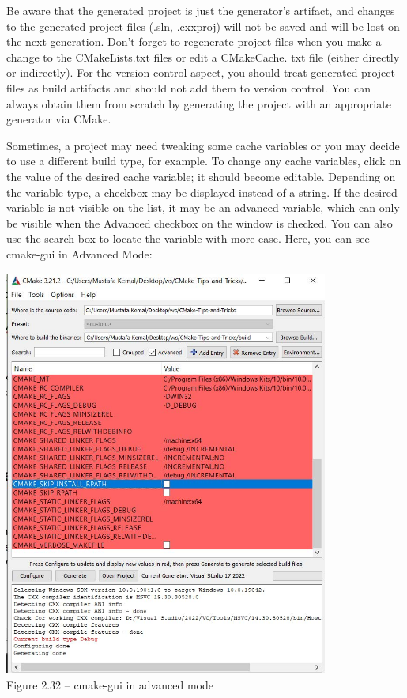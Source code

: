 \begin{tcolorbox}[colback=webgreen!5!white,colframe=webgreen!75!black,title=Important Note]
Be aware that the generated project is just the generator's artifact, and changes to the generated project files (.sln, .cxxproj) will not be saved and will be lost on the next generation. Don't forget to regenerate project files when you  make a change to the CMakeLists.txt files or edit a CMakeCache. txt file (either directly or indirectly). For the version-control aspect, you should treat generated project files as build artifacts and should not add them to version control. You can always obtain them from scratch by generating the project with an appropriate generator via CMake.
\end{tcolorbox}

Sometimes, a project may need tweaking some cache variables or you may decide to use a different build type, for example. To change any cache variables, click on the value of the desired cache variable; it should become editable. Depending on the variable type, a checkbox may be displayed instead of a string. If the desired variable is not visible on the list, it may be an advanced variable, which can only be visible when the Advanced checkbox on the window is checked. You can also use the search box to locate the variable with more ease. Here, you can see cmake-gui in Advanced Mode:

\begin{center}
\includegraphics[width=0.8\textwidth]{content/1/chapter2/images/32.jpg}\\
Figure 2.32 – cmake-gui in advanced mode
\end{center}

